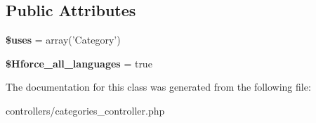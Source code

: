 \subsection*{\-Public \-Attributes}
\begin{DoxyCompactItemize}
\item 
\hypertarget{class_categories_controller_af0b01bb49dbdecdfd1d31a8605fa5067}{
{\bfseries \$uses} = array('\-Category')}
\label{class_categories_controller_af0b01bb49dbdecdfd1d31a8605fa5067}

\item 
\hypertarget{class_categories_controller_a2cbde1b8f51248c77d24484b2db3a436}{
{\bfseries \$\-Hforce\-\_\-all\-\_\-languages} = true}
\label{class_categories_controller_a2cbde1b8f51248c77d24484b2db3a436}

\end{DoxyCompactItemize}


\-The documentation for this class was generated from the following file\-:\begin{DoxyCompactItemize}
\item 
controllers/categories\-\_\-controller.\-php\end{DoxyCompactItemize}
